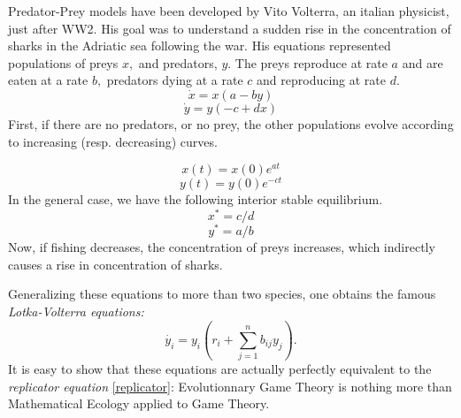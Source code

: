 Predator-Prey models have been developed by Vito Volterra, an italian physicist, just after WW2.  His goal was to understand a sudden rise in the concentration of sharks in the Adriatic sea following the war.  His equations represented populations of preys $x,$ and predators, $y.$  The preys reproduce at rate $a$ and are eaten at a rate $b,$ predators dying at a rate $c$ and reproducing at rate $d.$
\[\dot{x} = x(a-by)\]
\[\dot{y} = y(-c+dx)\]
First, if there are no predators, or no prey, the other populations evolve according to increasing (resp. decreasing) curves.

\[x(t)=x(0)e^{at}\]
\[y(t)=y(0)e^{-ct}\]
In the general case, we have the following interior stable equilibrium.
\[x^*=c/d\]
\[y^*=a/b\]
Now, if fishing decreases, the concentration of preys increases, which indirectly causes a rise in concentration of sharks.


Generalizing these equations to more than two species, one obtains the famous \emph{Lotka-Volterra equations:} 
\[\dot{y_i}=y_i(r_i + \sum_{j=1}^n b_{ij}y_j).\]
It is easy to show that these equations are actually perfectly equivalent to the {\it{replicator equation}} \eqref{replicator}: Evolutionnary Game Theory is nothing more than Mathematical Ecology applied to Game Theory.
